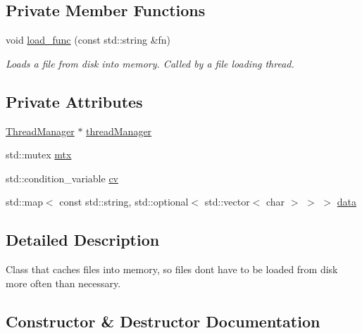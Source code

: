 \subsection*{Private Member Functions}
\begin{DoxyCompactItemize}
\item 
void \mbox{\hyperlink{classsage_1_1FileCache_a991e5569482a4f6f864dd9854c4524d0}{load\+\_\+func}} (const std\+::string \&fn)
\begin{DoxyCompactList}\small\item\em Loads a file from disk into memory. Called by a file loading thread. \end{DoxyCompactList}\end{DoxyCompactItemize}
\subsection*{Private Attributes}
\begin{DoxyCompactItemize}
\item 
\mbox{\hyperlink{classsage_1_1ThreadManager}{Thread\+Manager}} $\ast$ \mbox{\hyperlink{classsage_1_1FileCache_a02a6333cfba88c7e03a5952c23e253d9}{thread\+Manager}}
\item 
std\+::mutex \mbox{\hyperlink{classsage_1_1FileCache_a1bbc9aebae036d04a6eef1f74d535d5a}{mtx}}
\item 
std\+::condition\+\_\+variable \mbox{\hyperlink{classsage_1_1FileCache_ac6f227036472f8b5b5265d3126f992ae}{cv}}
\item 
std\+::map$<$ const std\+::string, std\+::optional$<$ std\+::vector$<$ char $>$ $>$ $>$ \mbox{\hyperlink{classsage_1_1FileCache_ac3d22a89c9d2ab8aa2af4949002a8df4}{data}}
\end{DoxyCompactItemize}


\subsection{Detailed Description}
Class that caches files into memory, so files don\textquotesingle{}t have to be loaded from disk more often than necessary. 

\subsection{Constructor \& Destructor Documentation}
\mbox{\label{classsage_1_1FileCache_af7d6799763e910957cee829000f9adb6}} 
